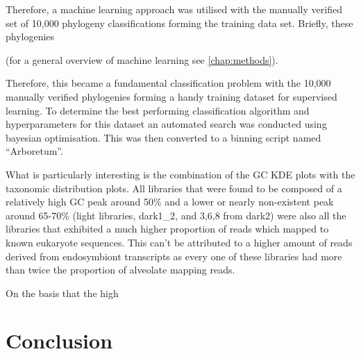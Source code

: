 Therefore, a machine learning approach was utilised with the manually verified set of 10,000 phylogeny
classifications forming the training data set. Briefly, these phylogenies 



(for a general overview of machine learning see
\ref{chap:methods}).



Therefore, this became a fundamental classification problem with the 10,000 manually verified phylogenies
forming a handy training dataset for supervised learning.   To determine the best performing
classification algorithm and hyperparameters for this dataset an automated search was conducted 
using bayesian optimisation.  This was then converted to a binning script named ``Arboretum''.



%
%



What is particularly interesting is the combination of the GC KDE plots 
with the taxonomic distribution plots.
All libraries that were found to be composed of a relatively high GC peak around 50\% 
and a lower or nearly non-existent peak around 65-70\% (light libraries, dark1\_2,
and 3,6,8 from dark2) were also all the libraries that exhibited a much higher
proportion of reads which mapped to known eukaryote sequences.
This can't be attributed to a higher amount of reads derived from endosymbiont
transcripts as every one of these libraries had more than twice the proportion of
alveolate mapping reads.



On the basis that the high 



\section{Conclusion}




